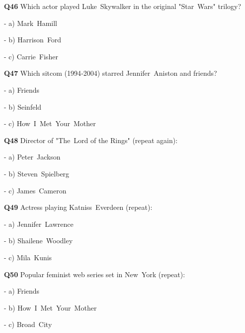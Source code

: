 \textbf{Q46} Which actor played Luke Skywalker in the original "Star Wars" trilogy?\par
\quad - a) Mark Hamill\par
\quad - b) Harrison Ford\par
\quad - c) Carrie Fisher\par

\textbf{Q47} Which sitcom (1994‑2004) starred Jennifer Aniston and friends?\par
\quad - a) Friends\par
\quad - b) Seinfeld\par
\quad - c) How I Met Your Mother\par

\textbf{Q48} Director of "The Lord of the Rings" (repeat again):\par
\quad - a) Peter Jackson\par
\quad - b) Steven Spielberg\par
\quad - c) James Cameron\par

\textbf{Q49} Actress playing Katniss Everdeen (repeat):\par
\quad - a) Jennifer Lawrence\par
\quad - b) Shailene Woodley\par
\quad - c) Mila Kunis\par

\textbf{Q50} Popular feminist web series set in New York (repeat):\par
\quad - a) Friends\par
\quad - b) How I Met Your Mother\par
\quad - c) Broad City\par